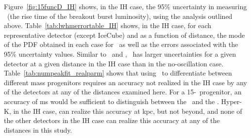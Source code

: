 Figure~\ref{fig:15funcD_IH} shows, in the IH case, the  95\% uncertainty
in measuring \trise\ (the rise time of the breakout burst 
luminosity), using the analysis outlined above. 
Table~\ref{tab:lwhmerrortable_IH}  shows, in the IH case, for each
representative detector (except IceCube) and as a function of
distance, the mode of the PDF obtained in each case for \trise\ as well
as the errors associated with the 95\% uncertainty values.
 Similar to \lmax\
and \tmax, \trise\ has larger uncertainties for a given detector at a
given distance in the IH case than in the no-oscillation case.  
Table~\ref{tab:numpeakfit_realparm} shows that using \trise\ to
differentiate between different mass progenitors requires an accuracy
not realized in the IH case by any of the detectors at any of  
the distances examined
here.  For a 15-\Msol\ progenitor, an accuracy of  ms would be
sufficient to distinguish between the \ls\ and the \shen.  Hyper-K, in
the IH case, can
realize this accuracy at  kpc, but not beyond, and none of the other
detectors in the IH case can realize this accuracy at any of the 
distances in this study. 

